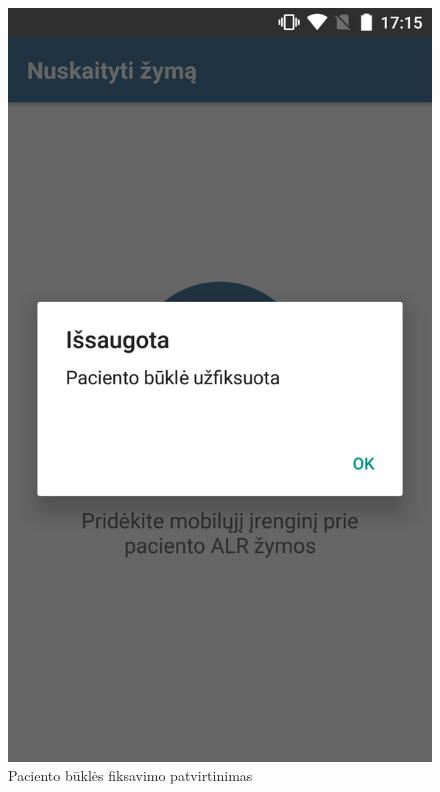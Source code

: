\documentclass{VUMIFPSbakalaurinis}
\begin{document}
\begin{figure}[H]
    \centering
    \includegraphics[scale=0.15]{images/prototype-1}
    \caption{Paciento būklės fiksavimo patvirtinimas} 
\end{figure}
\end{document}
